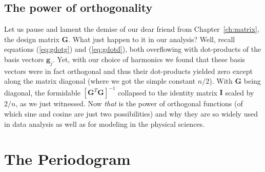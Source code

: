 \subsection{The power of orthogonality}
Let us pause and lament the demise of our dear friend from Chapter~\ref{ch:matrix}, the design matrix $\mathbf{G}$.
What just happen to it in our analysis?
Well, recall equations (\ref{eq:gdotg}) and (\ref{eq:gdotd}), both overflowing with dot-products of the basis vectors $\mathbf{g}_j$.
Yet, with our choice of harmonics we found that these basis vectors were in fact orthogonal and thus their dot-products yielded
zero except along the matrix diagonal (where we got the simple constant $n/2$).  With $\mathbf{G}$ being diagonal, the formidable $[\mathbf{G}^T\mathbf{G}]^{-1}$
collapsed to the identity matrix $\mathbf{I}$ scaled by $2/n$, as we just witnessed. Now \emph{that} is the power of
orthogonal functions (of which sine and cosine are just two possibilities) and why they are so widely used in data analysis as well as for modeling in the physical sciences.



\section{The Periodogram}
\label{sec:periodogram}

